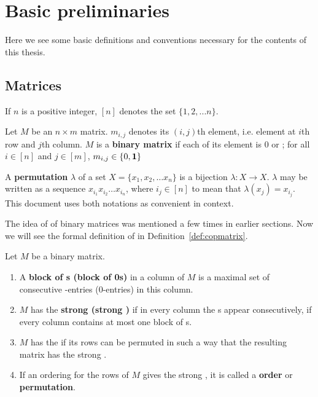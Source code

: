 \section[Basic preliminaries]{Basic preliminaries} 
\label{sec:basicprelim}

Here we see some basic definitions and conventions necessary for the contents
of this thesis.

\subsection{Matrices}
If $n$ is a positive integer, $[n]$ denotes the set $\{1,2,... n\}$.

\begin{definition}
  \label{def:binmatrix}
  Let $M$ be an $n \times m$ matrix. $m_{i,j}$ denotes its $(i,j)$th
  element, i.e. element at $i$th row and $j$th column. $M$ is a
  \textbf{binary matrix} if each of its element is 0 or \un; for all
  $i \in [n]$ and $j \in [m]$, $m_{i,j} \in \{0, \textbf{1}\}$
\end{definition}

\begin{definition}[Permutation]
  A \textbf{permutation} $\lambda$ of a set $X = \{x_1, x_2, \ldots
  x_n\}$ is a bijection $\lambda: X \rightarrow X$.  $\lambda$ may be
  written as a sequence $x_{i_1}x_{i_2}\ldots x_{i_n}$, where $i_j \in
  [n]$ to mean that $\lambda(x_j)= x_{i_j}$.  This document uses both
  notations as convenient in context.
\end{definition}

The idea of \cop of binary matrices was mentioned a few times in
earlier sections. Now we will see the formal definition of \COP in
Definition~\ref{def:copmatrix}.

\begin{definition}
  \label{def:copmatrix}
  Let $M$ be a binary matrix.
  \begin{enumerate}
  \hangindent {}
  \item A \textbf{block of \un s (block of 0s)} in a column of $M$ is a maximal set of
    consecutive \un-entries (0-entries) in this column.
  \item $M$ has the \textbf{strong \cop
      (strong \COP)} if in every column the \un s appear consecutively,
    \ie if every column contains at most one block of \un s.
  \item $M$ has the \textbf{\cop} if its rows can be
    permuted in such a way that the resulting matrix has the strong \COP.
  \item If an ordering for the rows of $M$ gives the strong \COP, it
    is called a \textbf{\COP order} or \textbf{\COP permutation}.
  \end{enumerate}
\end{definition}

